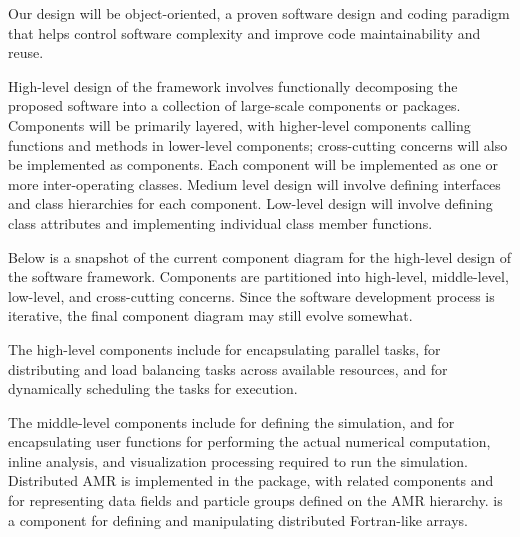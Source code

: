 \documentclass[10pt,twocolumn]{article}
\begin{document}
Our design will be object-oriented, a proven software design and
coding paradigm that helps control software complexity and improve
code maintainability and reuse.

High-level design of the framework involves functionally decomposing
the proposed software into a collection of large-scale components or
packages.  Components will be primarily layered, with higher-level
components calling functions and methods in lower-level components;
cross-cutting concerns will also be implemented as components.  Each
component will be implemented as one or more inter-operating classes.
Medium level design will involve defining interfaces and class
hierarchies for each component.  Low-level design will involve
defining class attributes and implementing individual class member
functions.

Below is a snapshot of the current component diagram for the
high-level design of the software framework.  Components are
partitioned into high-level, middle-level, low-level, and
cross-cutting concerns.  Since the software development process is
iterative, the final component diagram may still evolve somewhat.



The high-level components include  for encapsulating
parallel tasks,  for distributing and load balancing
tasks across available resources, and  for dynamically
scheduling the tasks for execution.

The middle-level components include  for defining the
simulation, and  for encapsulating user functions for
performing the actual numerical computation, inline analysis, and
visualization processing required to run the simulation.  Distributed
AMR is implemented in the  package, with related components
 and  for representing data fields and
particle groups defined on the AMR hierarchy.   is a
component for defining and manipulating distributed Fortran-like
arrays.
\end{document}

